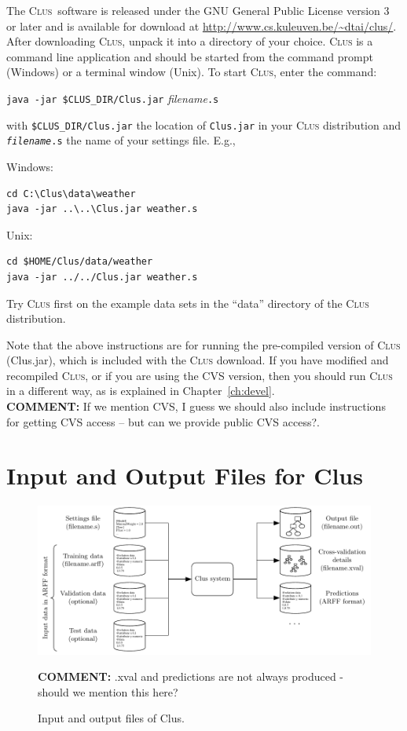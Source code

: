 \documentclass[a4paper]{report}
\newcommand{\clus}{\textsc{Clus}}
\newcommand{\comment}[1]{{\color{red}\textbf{COMMENT:} #1}}
\begin{document}
The \clus\ software is released under the GNU General Public License version 3 or later and is available for download at \url{http://www.cs.kuleuven.be/~dtai/clus/}. After downloading \clus{}, unpack it into a directory of your choice. \clus{} is a command line application and should be started from the command prompt (Windows) or a terminal window (Unix). To start \clus{}, enter the command:
\begin{flushleft}
\verb^java -jar $CLUS_DIR/Clus.jar^ {\em filename}\verb^.s^
\end{flushleft}

\noindent{}with \verb^$CLUS_DIR/Clus.jar^ the location of \verb^Clus.jar^ in your \clus{} distribution and {\tt {\em filename}.s} the name of your settings file. E.g.,

\begin{list}{}{\leftmargin=1.5cm}
\item[Windows:]\mbox{}
\begin{verbatim}
cd C:\Clus\data\weather
java -jar ..\..\Clus.jar weather.s
\end{verbatim}

\item[Unix:]\mbox{}
\begin{verbatim}
cd $HOME/Clus/data/weather
java -jar ../../Clus.jar weather.s
\end{verbatim}
\end{list}

\noindent{}Try \clus{} first on the example data sets in the ``data'' directory of the \clus{} distribution.

Note that the above instructions are for running the pre-compiled version of \clus{} (Clus.jar), which is included with the \clus{} download. If you have modified and recompiled \clus{}, or if you are using the CVS version, then you should run \clus{} in a different way, as is explained in Chapter~\ref{ch:devel}. \\\comment{If we mention CVS, I guess we should also include instructions for getting CVS access -- but can we provide public CVS access?.}

\section{Input and Output Files for Clus}

\begin{figure}[tb]
\includegraphics{fig/clusinout}
\caption{\label{fig:iofiles}Input and output files of Clus.}
\comment{.xval and predictions are not always produced - should we mention this here?}
\end{figure}
\end{document}
